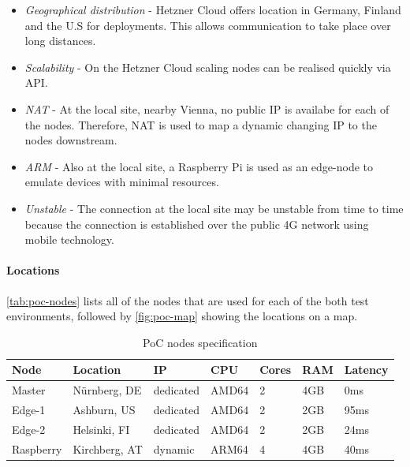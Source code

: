 \documentclass[MIC,Master,english]{twbook}%
\begin{document}
\begin{itemize}
    \item \textit{Geographical distribution} - Hetzner Cloud offers location in Germany, Finland and the U.S for deployments. This allows communication to take place over long distances.
    \item \textit{Scalability} - On the Hetzner Cloud scaling nodes can be realised quickly via \ac{API}.
    \item \textit{\ac{NAT}} - At the local site, nearby Vienna, no public IP is availabe for each of the nodes. Therefore, \ac{NAT} is used to map a dynamic changing IP to the nodes downstream.
    \item \textit{\ac{ARM}} - Also at the local site, a Raspberry Pi is used as an edge-node to emulate devices with minimal resources.
    \item \textit{Unstable} - The connection at the local site may be unstable from time to time because the connection is established over the public 4G network using mobile technology.
\end{itemize}

\paragraph{Locations} \autoref{tab:poc-nodes} lists all of the nodes that are used for each of the both test environments, followed by \autoref{fig:poc-map} showing the locations on a map.

\begin{table}[ht]
    \begin{center}
        \begin{tabular}{|l|l|l|l|l|l|l|}
            \hline
            Node & Location & IP & CPU & Cores & RAM & Latency \\
            \hline
            Master & Nürnberg, DE & dedicated & AMD64 & 2 & 4GB & 0ms \\
            Edge-1 & Ashburn, US & dedicated & AMD64 & 2 & 2GB & 95ms \\
            Edge-2 & Helsinki, FI & dedicated & AMD64 & 2 & 2GB & 24ms \\
            Raspberry & Kirchberg, AT & dynamic & ARM64 & 4 & 4GB & 40ms \\
            \hline
        \end{tabular}
        \caption{\ac{PoC} nodes specification}
        \label{tab:poc-nodes}
    \end{center}
\end{table}
\end{document}
